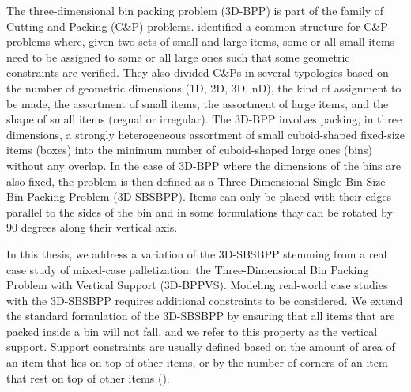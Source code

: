 The three-dimensional bin packing problem (3D-BPP) is part of the family of Cutting and Packing (C\&P) problems.
\cite{WASCHER20071109} identified a common structure for C\&P problems where, given two sets of small and large items, some or all small items need to be assigned to some or all large ones such that some geometric constraints are verified.
They also divided C\&Ps in several typologies based on the number of geometric dimensions (1D, 2D, 3D, nD), the kind of assignment to be made, the assortment of small items, the assortment of large items, and the shape of small items (regual or irregular).
The 3D-BPP involves packing, in three dimensions, a strongly heterogeneous assortment of small cuboid-shaped fixed-size items (boxes) into the minimum number of cuboid-shaped large ones (bins) without any overlap.
In the case of 3D-BPP where the dimensions of the bins are also fixed, the problem is then defined as a Three-Dimensional Single Bin-Size Bin Packing Problem (3D-SBSBPP).
Items can only be placed with their edges parallel to the sides of the bin and in some formulations thay can be rotated by $90$ degrees along their vertical axis.

In this thesis, we address a variation of the 3D-SBSBPP stemming from a real case study of mixed-case palletization: the Three-Dimensional Bin Packing Problem with Vertical Support (3D-BPPVS).
Modeling real-world case studies with the 3D-SBSBPP requires additional constraints to be considered. We extend the standard formulation of the 3D-SBSBPP by ensuring that all items that are packed inside a bin will not fall, and we refer to this property as the vertical support.
Support constraints are usually defined based on the amount of area of an item that lies on top of other items, or by the number of corners of an item that rest on top of other items (\cite{GZARA20201062, paquay2016mixed, kurpel2020exact}).

